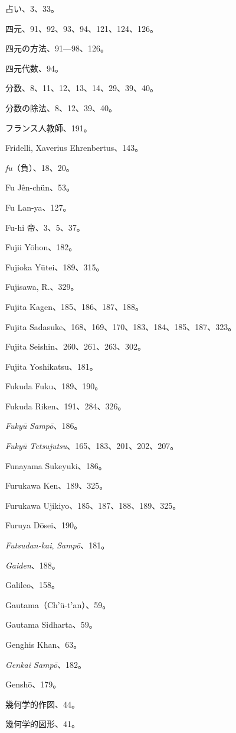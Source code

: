 \documentclass[11pt]{article}
\newcommand{\scanpage}[2]{\clearpage\setcounter{footnote}{0}\noindent{\footnotesize\color{gray}PDF #1 頁 · #2}\par\medskip}
\begin{document}
\scanpage{0349}{印刷頁 335}
占い、3、33。\par
四元、91、92、93、94、121、124、126。\par
四元の方法、91---98、126。\par
四元代数、94。\par
分数、8、11、12、13、14、29、39、40。\par
分数の除法、8、12、39、40。\par
フランス人教師、191。\par
Fridelli, Xaverius Ehrenbertus、143。\par
\emph{fu}（負）、18、20。\par
Fu Jên-chün、53。\par
Fu Lan-ya、127。\par
Fu-hi 帝、3、5、37。\par
Fujii Yōhon、182。\par
Fujioka Yūtei、189、315。\par
Fujisawa, R.、329。\par
Fujita Kagen、185、186、187、188。\par
Fujita Sadasuke、168、169、170、183、184、185、187、323。\par
Fujita Seishin、260、261、263、302。\par
Fujita Yoshikatsu、181。\par
Fukuda Fuku、189、190。\par
Fukuda Riken、191、284、326。\par
\emph{Fukyū Sampō}、186。\par
\emph{Fukyū Tetsujutsu}、165、183、201、202、207。\par
Funayama Sukeyuki、186。\par
Furukawa Ken、189、325。\par
Furukawa Ujikiyo、185、187、188、189、325。\par
Furuya Dōsei、190。\par
\emph{Futsudan-kai}, \emph{Sampō}、181。\par
\medskip
\emph{Gaiden}、188。\par
Galileo、158。\par
Gautama（Ch'ü-t'an）、59。\par
Gautama Sidharta、59。\par
Genghis Khan、63。\par
\emph{Genkai Sampō}、182。\par
Genshō、179。\par
幾何学的作図、44。\par
幾何学的図形、41。\par
\end{document}
